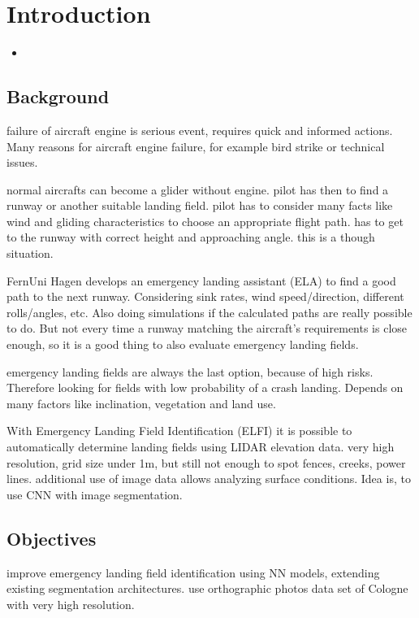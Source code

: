 \section{Introduction}
\begin{itemize}
    \item
\end{itemize}

\subsection{Background}
\cite{feu_fas}
failure of aircraft engine is serious event, requires quick and informed actions. Many reasons for aircraft engine failure, for example bird strike or technical issues.

normal aircrafts can become a glider without engine. pilot has then to find a runway or another suitable landing field. pilot has to consider many facts like wind and gliding characteristics to choose an appropriate flight path. has to get to the runway with correct height and approaching angle. this is a though situation.

FernUni Hagen develops an emergency landing assistant (ELA) to find a good path to the next runway. Considering sink rates, wind speed/direction, different rolls/angles, etc. Also doing simulations if the calculated paths are really possible to do. But not every time a runway matching the aircraft's requirements is close enough, so it is a good thing to also evaluate emergency landing fields.


\cite{feu_elfi}
emergency landing fields are always the last option, because of high risks. Therefore looking for fields with low probability of a crash landing. Depends on many factors like inclination, vegetation and land use.

With Emergency Landing Field Identification (ELFI) it is possible to automatically determine landing fields using LIDAR elevation data. very high resolution, grid size under 1m, but still not enough to spot fences, creeks, power lines. additional use of image data allows analyzing surface conditions. Idea is, to use CNN with image segmentation.

\subsection{Objectives}
improve emergency landing field identification using NN models, extending existing segmentation architectures. use orthographic photos data set of Cologne with very high resolution.

